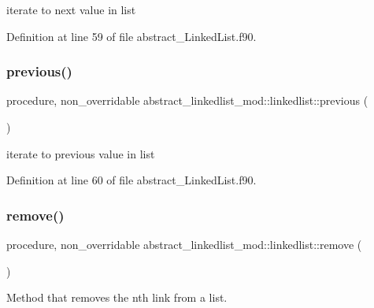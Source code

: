 iterate to next value in list 



Definition at line 59 of file abstract\+\_\+\+Linked\+List.\+f90.

\mbox{\label{structabstract__linkedlist__mod_1_1linkedlist_a655ba9438cdca6f2a52fd317e474fd70}} 
\subsubsection{\texorpdfstring{previous()}{previous()}}
{\footnotesize\ttfamily procedure, non\+\_\+overridable abstract\+\_\+linkedlist\+\_\+mod\+::linkedlist\+::previous (\begin{DoxyParamCaption}{ }\end{DoxyParamCaption})\hspace{0.3cm}{\ttfamily [private]}}



iterate to previous value in list 



Definition at line 60 of file abstract\+\_\+\+Linked\+List.\+f90.

\mbox{\label{structabstract__linkedlist__mod_1_1linkedlist_a8d5f5b478ec685dfdc93cb491d2d30f9}} 
\subsubsection{\texorpdfstring{remove()}{remove()}}
{\footnotesize\ttfamily procedure, non\+\_\+overridable abstract\+\_\+linkedlist\+\_\+mod\+::linkedlist\+::remove (\begin{DoxyParamCaption}{ }\end{DoxyParamCaption})\hspace{0.3cm}{\ttfamily [private]}}



Method that removes the nth link from a list. 



